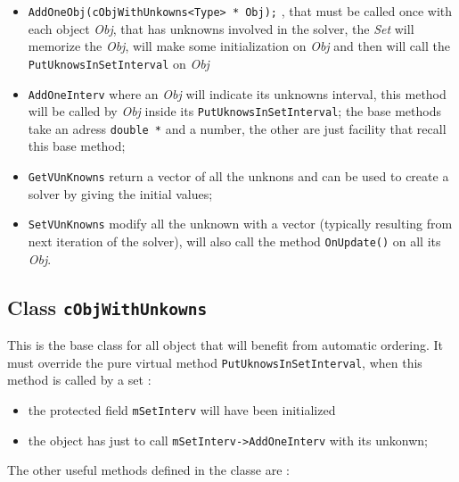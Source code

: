 \label{cSetIUK}

\begin{itemize}
    \item  {\tt  AddOneObj(cObjWithUnkowns<Type> * Obj);} , that must be called once with each object \emph{Obj},
           that has unknowns involved in the solver, the \emph{Set} will memorize the \emph{Obj},
           will make some initialization on  \emph{Obj} and then will call    the
           {\tt PutUknowsInSetInterval} on  \emph{Obj} 

    \item  {\tt  AddOneInterv} where an \emph{Obj}  will indicate its unknowns interval,
          this method will be  called by  \emph{Obj} inside its {\tt PutUknowsInSetInterval};
          the base methods take an adress {\tt double *} and a number, the other are
          just facility that recall this base method;
          
    \item  {\tt GetVUnKnowns}  return a vector of all the unknons and can be used to create a solver
           by giving the initial values;

    \item  {\tt SetVUnKnowns}  modify all the unknown with a vector (typically resulting from
           next iteration of the solver), will also call the method {\tt OnUpdate()} on all its \emph{Obj}.
\end{itemize}




\subsection{Class {\tt cObjWithUnkowns}}

\label{ClassOWU}

This is the base class for all object that will benefit from automatic ordering. It must override
the pure virtual method {\tt PutUknowsInSetInterval}, when this method is called by a set :

\begin{itemize}
   \item the protected field {\tt mSetInterv} will have been initialized 
   \item the object has just to call {\tt mSetInterv->AddOneInterv} with its unkonwn;
\end{itemize}

The other useful methods defined in the classe are :

